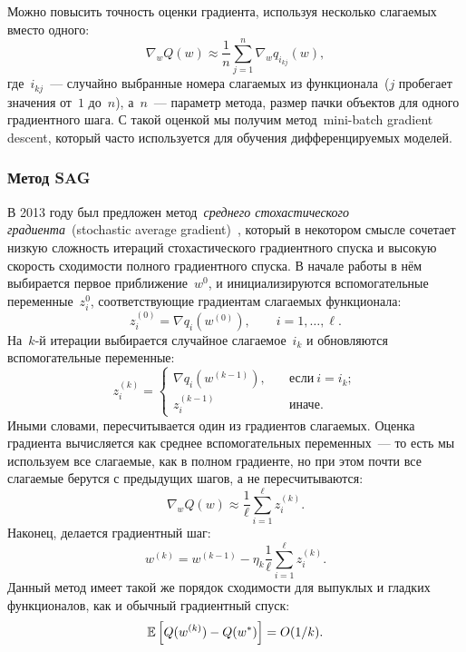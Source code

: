 \documentclass[12pt,fleqn]{article}
\begin{document}
Можно повысить точность оценки градиента, используя несколько слагаемых вместо одного:
\[
    \nabla_w Q(w)
    \approx
    \frac{1}{n}
    \sum_{j = 1}^{n}
    \nabla_w q_{i_{kj}}(w),
\]
где~$i_{kj}$~--- случайно выбранные номера слагаемых из функционала~($j$ пробегает значения от~$1$ до~$n$),
а~$n$~--- параметр метода, размер пачки объектов для одного градиентного шага.
С такой оценкой мы получим метод~mini-batch gradient descent,
который часто используется для обучения дифференцируемых моделей.

\subsubsection{Метод SAG}

В 2013 году был предложен метод~\emph{среднего стохастического градиента}~(stochastic average gradient)~\cite{schmidt13sag},
который в некотором смысле сочетает низкую сложность итераций стохастического градиентного спуска
и высокую скорость сходимости полного градиентного спуска.
В начале работы в нём выбирается первое приближение~$w^0$,
и инициализируются вспомогательные переменные~$z_i^0$,
соответствующие градиентам слагаемых функционала:
\[
    z_i^{(0)}
    =
    \nabla q_i(w^{(0)}),
    \qquad
    i = 1, \dots, \ell.
\]
На~$k$-й итерации выбирается случайное слагаемое~$i_k$ и
обновляются вспомогательные переменные:
\[
    z_i^{(k)}
    =
    \begin{cases}
        \nabla q_i(w^{(k - 1)}),
        \quad
        &\text{если}\ i = i_k;\\
        z_i^{(k - 1)}
        \quad
        &\text{иначе}.
    \end{cases}
\]
Иными словами, пересчитывается один из градиентов слагаемых.
Оценка градиента вычисляется как среднее вспомогательных переменных~---
то есть мы используем все слагаемые, как в полном градиенте,
но при этом почти все слагаемые берутся с предыдущих шагов, а не пересчитываются:
\[
    \nabla_w Q(w)
    \approx
    \frac{1}{\ell}
    \sum_{i = 1}^{\ell}
        z_i^{(k)}.
\]
Наконец, делается градиентный шаг:
\begin{equation}
\label{eq:sag}
    w^{(k)}
    =
    w^{(k - 1)}
    -
    \eta_k
    \frac{1}{\ell}
    \sum_{i = 1}^{\ell}
    z_i^{(k)}.
\end{equation}
Данный метод имеет такой же порядок сходимости для выпуклых и гладких функционалов,
как и обычный градиентный спуск:
\[
    \mathbb{E} \left[
        Q(w^{(k)}) - Q(w^*)
    \right]
    =
    O(1 / k).
\]
\end{document}
